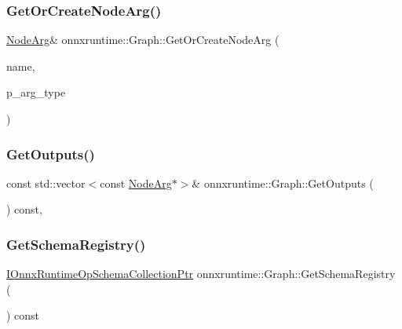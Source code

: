 \subsubsection{\texorpdfstring{Get\+Or\+Create\+Node\+Arg()}{GetOrCreateNodeArg()}}
{\footnotesize\ttfamily \mbox{\hyperlink{classonnxruntime_1_1NodeArg}{Node\+Arg}}\& onnxruntime\+::\+Graph\+::\+Get\+Or\+Create\+Node\+Arg (\begin{DoxyParamCaption}\item[{const std\+::string \&}]{name,  }\item[{const O\+N\+N\+X\+\_\+\+N\+A\+M\+E\+S\+P\+A\+C\+E\+::\+Type\+Proto $\ast$}]{p\+\_\+arg\+\_\+type }\end{DoxyParamCaption})\hspace{0.3cm}{\ttfamily [inline]}}

\mbox{\label{classonnxruntime_1_1Graph_a99c7d068aa441c8206c05539843586fa}} 
\subsubsection{\texorpdfstring{Get\+Outputs()}{GetOutputs()}}
{\footnotesize\ttfamily const std\+::vector$<$const \mbox{\hyperlink{classonnxruntime_1_1NodeArg}{Node\+Arg}}$\ast$$>$\& onnxruntime\+::\+Graph\+::\+Get\+Outputs (\begin{DoxyParamCaption}{ }\end{DoxyParamCaption}) const\hspace{0.3cm}{\ttfamily [inline]}, {\ttfamily [noexcept]}}

\mbox{\label{classonnxruntime_1_1Graph_a75e0404bbe9fbd90955553ecdf777cbe}} 
\subsubsection{\texorpdfstring{Get\+Schema\+Registry()}{GetSchemaRegistry()}}
{\footnotesize\ttfamily \mbox{\hyperlink{namespaceonnxruntime_af9a8d0a11a8e0ccd714c7ddc2fabe41d}{I\+Onnx\+Runtime\+Op\+Schema\+Collection\+Ptr}} onnxruntime\+::\+Graph\+::\+Get\+Schema\+Registry (\begin{DoxyParamCaption}{ }\end{DoxyParamCaption}) const}

